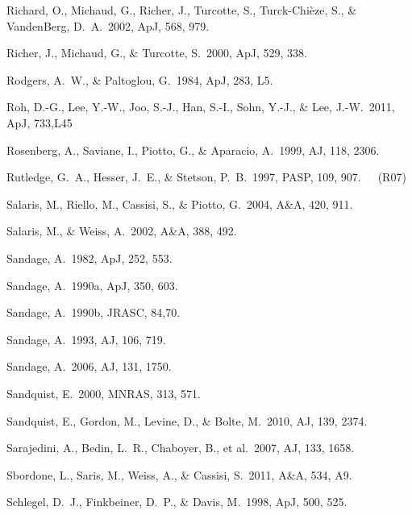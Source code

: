 \documentclass[12pt,preprint]{aastex}
\begin{document}
\begin{thebibliography}{}

Richard, O., Michaud, G., Richer, J., Turcotte, S., Turck-Chi\`eze, S., \&
 VandenBerg, D.~A.~2002, ApJ, 568, 979.

Richer, J., Michaud, G., \& Turcotte, S.~2000, ApJ, 529, 338.

Rodgers, A.~W., \& Paltoglou, G.~1984, ApJ, 283, L5.

Roh, D.-G., Lee, Y.-W., Joo, S.-J., Han, S.-I., Sohn, Y.-J., \& Lee,
 J.-W.~2011, ApJ, 733,L45

Rosenberg, A., Saviane, I., Piotto, G., \& Aparacio, A.~1999, AJ, 118, 2306.

Rutledge, G.~A., Hesser, J.~E., \& Stetson, P.~B.~1997, PASP, 109,
 907.\ \ \ (R07)

Salaris, M., Riello, M., Cassisi, S., \& Piotto, G.~2004, A\&A, 420, 911.

Salaris, M., \& Weiss, A.~2002, A\&A, 388, 492.

Sandage, A.~1982, ApJ, 252, 553.

Sandage, A.~1990a, ApJ, 350, 603.

Sandage, A.~1990b, JRASC, 84,70.

Sandage, A.~1993, AJ, 106, 719.

Sandage, A.~2006, AJ, 131, 1750.

Sandquist, E.~2000, MNRAS, 313, 571.

Sandquist, E., Gordon, M., Levine, D., \& Bolte, M.~2010, AJ, 139, 2374.

Sarajedini, A., Bedin, L.~R., Chaboyer, B., et al.~2007, AJ, 133, 1658.

Sbordone, L., Saris, M., Weiss, A., \& Cassisi, S.~2011, A\&A, 534, A9.

Schlegel, D.~J., Finkbeiner, D.~P., \& Davis, M.~1998, ApJ, 500, 525.


\end{thebibliography}
\end{document}
